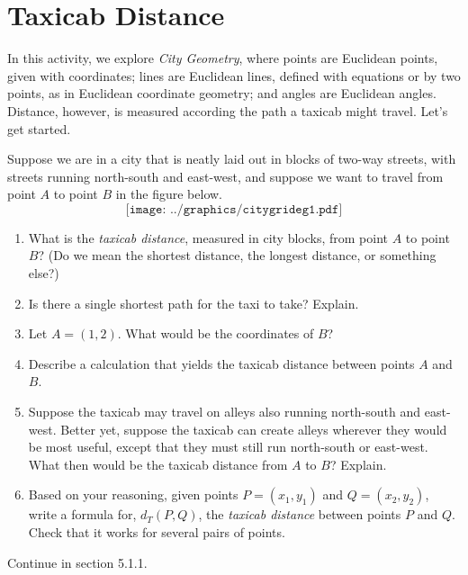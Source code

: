 \newpage

\section{Taxicab Distance}
In this activity, we explore \emph{City Geometry}, where points are Euclidean points, given with coordinates; lines are Euclidean lines, defined with equations or by two points, as in Euclidean coordinate geometry; and angles are Euclidean angles.  Distance, however, is measured according the path a taxicab might travel.  Let's get started.  
\begin{prob}
Suppose we are in a city that is neatly laid out in blocks of two-way streets, with streets running north-south and east-west, and suppose we want to travel from point $A$ to point $B$ in the figure below.  
\[
\texttt{[image: ../graphics/citygrideg1.pdf]}
\]
\begin{enumerate}
\item What is the \emph{taxicab distance}, measured in city blocks, from point $A$ to point $B$?  (Do we mean the shortest distance, the longest distance, or something else?)  
\item Is there a single shortest path for the taxi to take?  Explain.  
\item Let $A = (1,2)$. What would be the coordinates of $B$?  
\item Describe a calculation that yields the taxicab distance between points $A$ and $B$.  
\item Suppose the taxicab may travel on alleys also running north-south and east-west.  Better yet, suppose the taxicab can create alleys wherever they would be most useful, except that they must still run north-south or east-west.  What then would be the taxicab distance from $A$ to $B$?  Explain.  
\item Based on your reasoning, given points $P = (x_1, y_1)$ and $Q= (x_2, y_2)$, write a formula for, $d_T(P,Q)$, the \emph{taxicab distance} between points $P$ and $Q$.  Check that it works for several pairs of points.  
\end{enumerate}
\end{prob}

Continue in section 5.1.1.  

